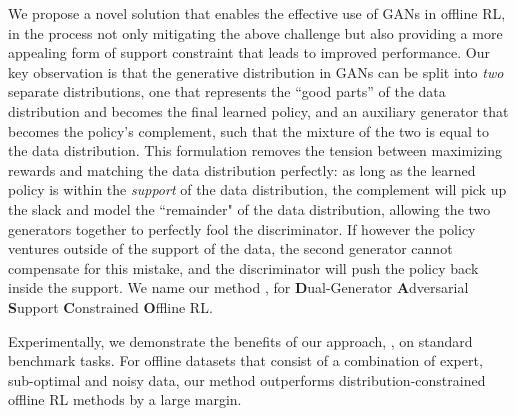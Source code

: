 We propose a novel solution that enables the effective use of GANs in offline RL, in the process not only mitigating the above challenge but also providing a more appealing form of support constraint that leads to improved performance. Our key observation is that the generative distribution in GANs can be split into \emph{two} separate distributions, one that represents the ``good parts'' of the data distribution and becomes the final learned policy, and an auxiliary generator that becomes the policy's complement, such that the mixture of the two is equal to the data distribution. This formulation removes the tension between maximizing rewards and matching the data distribution perfectly: as long as the learned policy is within the \emph{support} of the data distribution, the complement will pick up the slack and model the ``remainder" of the data distribution, allowing the two generators together to perfectly fool the discriminator. If however the policy ventures outside of the support of the data, the second generator cannot compensate for this mistake, and the discriminator will push the policy back inside the support. 
We name our method \name, for \textbf{D}ual-Generator \textbf{A}dversarial \textbf{S}upport \textbf{C}onstrained \textbf{O}ffline RL.

Experimentally, we demonstrate the benefits of our approach, \name{},
on standard benchmark tasks. For offline datasets that consist of a combination of expert, sub-optimal and noisy data,
our method outperforms distribution-constrained offline RL methods by a large margin.  
